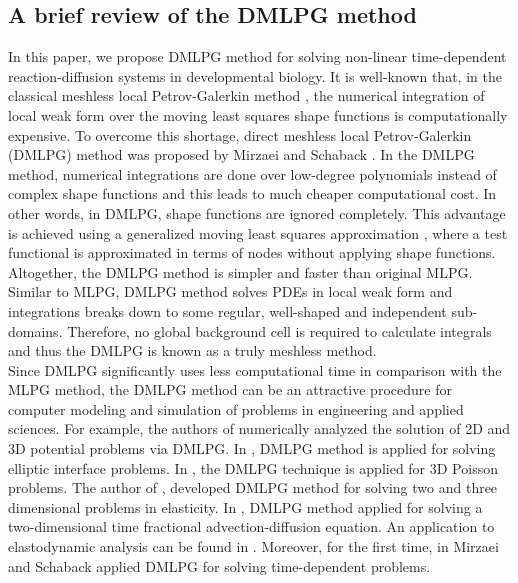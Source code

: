 \documentclass[12pt]{article}
\numberwithin{equation}{section}
\begin{document}
\subsection{A brief review of the DMLPG method}
In this paper, we propose DMLPG method for solving non-linear time-dependent reaction-diffusion systems in developmental biology.  It is well-known that, in the classical meshless local Petrov-Galerkin method
\cite{Atluri, Atluri1, Atluri2, Dai1, Dai2,Dai3, Ghesmati,Salehi2,Salehi, Dong, Mazzia1, Shirzadi, Shirzadi2,Shivanian, Shivanian2,Shivanian3,Wang,Wei,ZhangT},
the numerical integration of local weak form
over the moving least squares shape functions is computationally expensive. To overcome this shortage, direct meshless local Petrov-Galerkin (DMLPG) method was proposed by Mirzaei and Schaback \cite{Mirzaei}. In the DMLPG method, numerical integrations are done over low-degree polynomials instead of complex shape functions and this leads to much cheaper computational cost. In other words, in DMLPG, shape functions are ignored completely. This advantage is achieved using a generalized moving least squares approximation \cite{Mirzaei1}, where
a test functional is approximated in terms of nodes without applying shape functions. Altogether, the DMLPG method is simpler and faster than
original MLPG.
Similar to MLPG, DMLPG method solves PDEs in local weak form and integrations breaks down to some regular, well-shaped and
independent sub-domains. Therefore, no global background cell is required to
calculate integrals and thus the DMLPG is known as a truly meshless method.\\
Since DMLPG
significantly uses less computational time in comparison with the MLPG method, the DMLPG
method can be an attractive procedure for computer modeling and simulation of problems in engineering and applied sciences. For example, the authors of \cite{Mazzia} numerically analyzed the solution of 2D and 3D potential problems via DMLPG. In \cite{taleei}, DMLPG method is applied for solving elliptic interface problems. In \cite{Sartoretto}, the DMLPG technique is applied for 3D Poisson problems. The author of \cite{MirzaeiT}, developed DMLPG method for solving two and three dimensional problems in elasticity. In \cite{MirzaeiRamezani}, DMLPG method applied for
solving a two-dimensional time fractional advection-diffusion equation. An
application to elastodynamic analysis can be found in \cite{Mirzaei4}. Moreover, for the first time, in \cite{MirzaeiH} Mirzaei and Schaback applied DMLPG for solving time-dependent problems.
\end{document}
